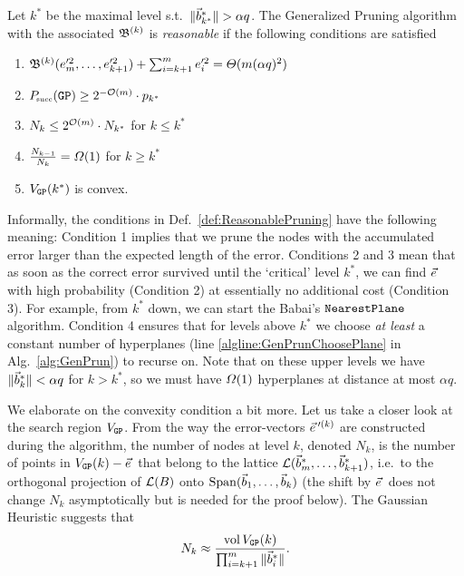 \begin{definition} \label{def:ReasonablePruning}
Let $k^*$ be the maximal level s.t.\ $\| \vec b^*_{k^*} \| > \alpha q$. The Generalized Pruning algorithm with the associated $\mathfrak{B}^{(k)}$ is \emph{reasonable} if the following conditions are satisfied
 \begin{enumerate}
 	\setlength\itemsep{0.1em}
 	\item $\mathfrak{B}^{(k)}(e'^2_m, \ldots, e'^2_{k+1}) + \sum_{i=k+1}^m e'^2_i = \varTheta(m (\alpha q)^2)$ 
 	\item $P\mkern-4mu_{\mbox{\tiny succ}}(\texttt{GP}) \geq 2^{-\mathcal{O}(m)} \cdot p_{k^*}$
 	\item $N_k \leq 2^{\mathcal{O}(m)} \cdot N_{k^*}$ for $k \leq k^*$
 	\item $\frac{N_{k-1}}{N_k} = \varOmega(1)$ for $k \geq k^*$
 	\item $V_{\texttt{GP}}(k^*)$ is convex.
 \end{enumerate}
\end{definition} 

Informally, the conditions in Def.~\ref{def:ReasonablePruning} have the following meaning: Condition 1 implies that we prune the nodes with the accumulated error larger than the expected length of the \LWE error. Conditions 2 and 3 mean that as soon as the correct error survived until the `critical' level $k^*$, we can find $\evec$ with high probability (Condition 2) at essentially no additional cost (Condition 3). For example, from $k^*$ down, we can start the Babai's $\texttt{NearestPlane}$ algorithm. Condition 4 ensures that for levels above $k^*$ we choose \emph{at least} a constant number of hyperplanes (line \ref{algline:GenPrunChoosePlane} in Alg.~\ref{alg:GenPrun}) to recurse on. Note that on these upper levels we have $\| \vec b^*_k \| < \alpha q$ for $k>k^*$, so we must have $\varOmega(1)$ hyperplanes at distance at most $\alpha q$.

We elaborate on the convexity condition a bit more. Let us take a closer look at the search region $V_{\texttt{GP}}$. From the way the error-vectors $\evec'^{(k)}$ are constructed during the algorithm, the number of nodes at level $k$, denoted $N_k$, is the number of points in $V_{\GP}(k) - \evec$ that belong to the lattice $\mathcal{L}(\vec b^*_m, \ldots, \vec b^*_{k+1})$, i.e.\ to the orthogonal projection of $\mathcal{L}(B)$ onto $\operatorname{Span}(\vec b_1, \ldots, \vec b_k)$ (the shift by $\evec$ does not change $N_k$ asymptotically but is needed for the proof below). The Gaussian Heuristic suggests that
\begin{equation*} %
	N_k \approx \frac{\vol V_{\GP}(k)}{\prod_{i=k+1}^m \| \wbvec_i \|}.
\end{equation*}

